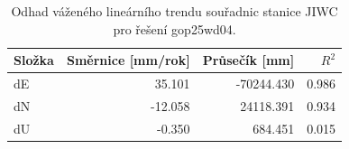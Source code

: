 \begin{table}[htbp]
\caption{Odhad váženého lineárního trendu souřadnic stanice JIWC pro řešení gop25wd04.}
\label{tab:gop25wd04_stcd_jiwc_weighted_1seg}
\begin{tabular}{lrrr}
\toprule
Složka & Směrnice [mm/rok] & Průsečík [mm] & $R^2$ \\
\midrule
dE & 35.101 & -70244.430 & 0.986 \\
dN & -12.058 & 24118.391 & 0.934 \\
dU & -0.350 & 684.451 & 0.015 \\
\bottomrule
\end{tabular}
\end{table}
